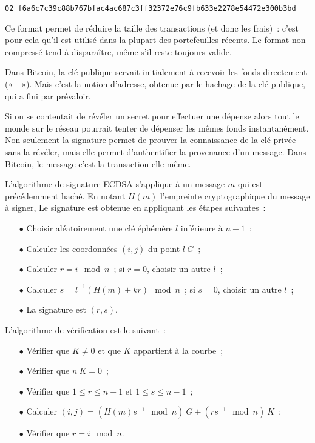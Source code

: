 \begin{Verbatim}[fontsize=\footnotesize]
02 f6a6c7c39c88b767bfac4ac687c3ff32372e76c9fb633e2278e54472e300b3bd
\end{Verbatim}

Ce format permet de réduire la taille des transactions (et donc les frais)~: c'est pour cela qu'il est utilisé dans la plupart des portefeuilles récents. Le format non compressé tend à disparaître, même s'il reste toujours valide.

Dans Bitcoin, la clé publique servait initialement à recevoir les fonds directement («~~»). Mais c'est la notion d'adresse, obtenue par le hachage de la clé publique, qui a fini par prévaloir.


Si on se contentait de révéler un secret pour effectuer une dépense alors tout le monde sur le réseau pourrait tenter de dépenser les mêmes fonds instantanément. Non seulement la signature permet de prouver la connaissance de la clé privée sans la révéler, mais elle permet d'authentifier la provenance d'un message. Dans Bitcoin, le message c'est la transaction elle-même.

L'algorithme de signature ECDSA s'applique à un message $m$ qui est précédemment haché. En notant $H(m)$ l'empreinte cryptographique du message à signer, Le signature est obtenue en appliquant les étapes suivantes~:

\begin{itemize}
  \item[$\bullet$] Choisir aléatoirement une clé éphémère $l$ inférieure à $n-1$~;
  \item[$\bullet$] Calculer les coordonnées $(i,j)$ du point $l~G$~;
  \item[$\bullet$] Calculer $r = i \mod n$~; si $r = 0$, choisir un autre $l$~;
  \item[$\bullet$] Calculer $s = l^{-1} ( H(m) + k r ) \mod n$~; si $s = 0$, choisir un autre $l$~;
  \item[$\bullet$] La signature est $( r, s )$.
\end{itemize}

L'algorithme de vérification est le suivant~:

\begin{itemize}
  \item[$\bullet$] Vérifier que $K \ne 0$ et que $K$ appartient à la courbe~;
  \item[$\bullet$] Vérifier que $n~K = 0$~;
  \item[$\bullet$] Vérifier que $1 \leq r \leq n - 1$ et $1 \leq s \leq n - 1$~;
  \item[$\bullet$] Calculer $(i, j) = ( H(m) s^{-1} \mod n )~G + ( r s^{-1} \mod n  )~K$~;
  \item[$\bullet$] Vérifier que $r = i \mod n$.
\end{itemize}

